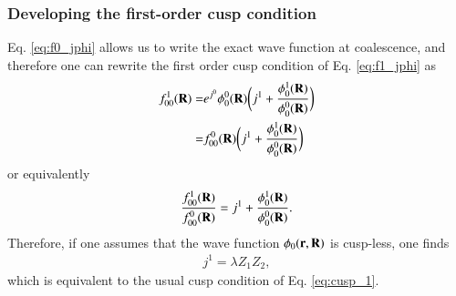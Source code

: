 \documentclass[aip,jcp,reprint,noshowkeys,superscriptaddress]{revtex4-1}
\newcommand{\bd}[1]{{\bf {#1}}}
\newcommand{\br}[0]{{\bf {r}}}
\begin{document}
\subsubsection{Developing the first-order cusp condition}
Eq. \eqref{eq:f0_jphi} allows us to write the exact wave function at coalescence, and therefore one can rewrite the 
first order cusp condition of Eq. \eqref{eq:f1_jphi} as 
\begin{equation}
 \begin{aligned}
 f_{00}^1(\bd{R}) = & e^{j^0} \phi_0^0(\bd{R}) \bigg( j^1 + \frac{\phi_0^1(\bd{R})}{\phi_0^0(\bd{R})} \bigg) \\
                  = & f_{00}^0(\bd{R})         \bigg( j^1 + \frac{\phi_0^1(\bd{R})}{\phi_0^0(\bd{R})} \bigg) 
 \end{aligned}
\end{equation}
or equivalently
\begin{equation}
 \begin{aligned}
 \frac{f_{00}^1(\bd{R})}{f_{00}^0(\bd{R})} = j^1 + \frac{\phi_0^1(\bd{R})}{\phi_0^0(\bd{R})}. 
 \end{aligned}
\end{equation}
Therefore, if one assumes that the wave function $\phi_0(\br,\bd{R})$ is cusp-less, one finds 
\begin{equation}
 \begin{aligned}
  j^1 = \lambda Z_1 Z_2, 
 \end{aligned}
\end{equation}
which is equivalent to the usual cusp condition of Eq. \eqref{eq:cusp_1}. 
\end{document}
